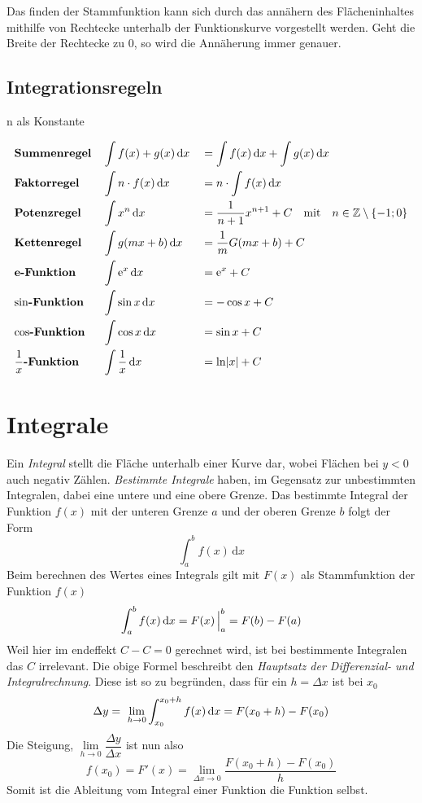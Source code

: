 \documentclass{article}
\begin{document}
Das finden der Stammfunktion kann sich durch das annähern des Flächeninhaltes mithilfe von Rechtecke unterhalb der Funktionskurve vorgestellt werden. Geht die Breite der Rechtecke zu $0$, so wird die Annäherung immer genauer.
 
\subsection{Integrationsregeln} 
$\mathrm{n}$ als Konstante 
\begin{multicols}{2} %
 \noindent \begin{align*}
  &\text{\textbf{Summenregel}} &&\int f(x) + g(x) \,\mathrm{d}{x} &&= \int f(x) \,\mathrm{d}{x} + \int g(x) \,\mathrm{d}{x} \\ 
  &\text{\textbf{Faktorregel}} &&\int n \cdot f(x) \,\mathrm{d}{x} &&= n \cdot \int f(x) \,\mathrm{d}{x} \\
  &\text{\textbf{Potenzregel}} &&\int x^n \,\mathrm{d}{x} &&= \frac{1}{n+1}x^{n+1} + C \quad \text{mit} \quad n \in \mathbb{Z} \setminus \{-1; 0\} \\
  &\text{\textbf{Kettenregel}} &&\int g(mx+b) \,\mathrm{d}{x} &&= \frac{1}{m} G(mx+b) + C \\     
  &\text{\textbf{e-Funktion}} &&\int \mathrm{e}^x \,\mathrm{d}{x} &&= \mathrm{e}^x + C \\
  &\text{\textbf{$\sin$-Funktion}} &&\int \sin x \,\mathrm{d}{x} &&= -\cos x + C \\
  &\text{\textbf{$\cos$-Funktion}} &&\int \cos x \,\mathrm{d}{x} &&= \sin x + C \\
  &\text{\textbf{$\frac{1}{x}$-Funktion}} &&\int \frac{1}{x} \,\mathrm{d}{x} &&= \ln \lvert x \rvert + C \\
 \end{align*} 
\end{multicols}
 
\section{Integrale}  
Ein \emph{Integral} stellt die Fläche unterhalb einer Kurve dar, wobei Flächen bei $y<0$ auch negativ Zählen. \emph{Bestimmte Integrale} haben, im Gegensatz zur unbestimmten Integralen, dabei eine untere und eine obere Grenze. Das bestimmte Integral der Funktion $f(x)$ mit der unteren Grenze $a$ und der oberen Grenze $b$ folgt der Form 
\[
 \int_a^b f(x) \,\mathrm{d}x
\]
Beim berechnen des Wertes eines Integrals gilt mit $F(x)$ als Stammfunktion der Funktion $f(x)$
\[
 \int_a^b f(x) \,\mathrm{d}{x} =
 F(x) \,\Bigr|_a^b =
 F(b) - F(a)
\] 
Weil hier im endeffekt $C-C=0$ gerechnet wird, ist bei bestimmente Integralen das $C$ irrelevant.
Die obige Formel beschreibt den \emph{Hauptsatz der Differenzial-  und Integralrechnung}. Diese ist so zu begründen, dass für ein $h=\Delta x$ ist bei $x_0$ 
\[
 \Delta y = \lim_{h \to 0} 
 \int_{x_0}^{x_0+h} f(x) \dx = F(x_0+h)-F(x_0) 
\]
Die Steigung, $\lim\limits_{h \to 0} \dfrac{\Delta y}{\Delta x}$ ist nun also
\[
 f(x_0) = F'(x) = \lim_{\Delta x \to 0} \frac{F(x_0+h)-F(x_0)}{h} 
\]
Somit ist die Ableitung vom Integral einer Funktion die Funktion selbst.
 
\end{document}
